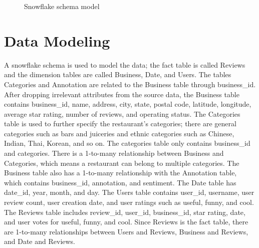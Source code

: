 \documentclass[11pt,journal,compsoc]{IEEEtran}
\begin{document}
\begin{figure*}[h]
\centering
{}
\caption{Snowflake schema model}
\label{fig_sim}
\end{figure*}

\section{Data Modeling}
A snowflake schema is used to model the data; the fact table is called Reviews and the dimension tables are called Business, Date, and Users. The tables Categories and Annotation are related to the Business table through business\_id. After dropping irrelevant attributes from the source data, the Business table contains business\_id, name, address, city, state, postal code, latitude, longitude, average star rating, number of reviews, and operating status. The Categories table is used to further specify the restaurant’s categories; there are general categories such as bars and juiceries and ethnic categories such as Chinese, Indian, Thai, Korean, and so on. The categories table only contains business\_id and categories. There is a 1-to-many relationship between Business and Categories, which means a restaurant can belong to multiple categories. The Business table also has a 1-to-many relationship with the Annotation table, which contains business\_id, annotation, and sentiment. The Date table has date\_id, year, month, and day. The Users table contains user\_id, username, user review count, user creation date, and user ratings such as useful, funny, and cool. The Reviews table includes review\_id, user\_id, business\_id, star rating, date, and user votes for useful, funny, and cool. Since Reviews is the fact table, there are 1-to-many relationships between Users and Reviews, Business and Reviews, and Date and Reviews. 
\end{document}
